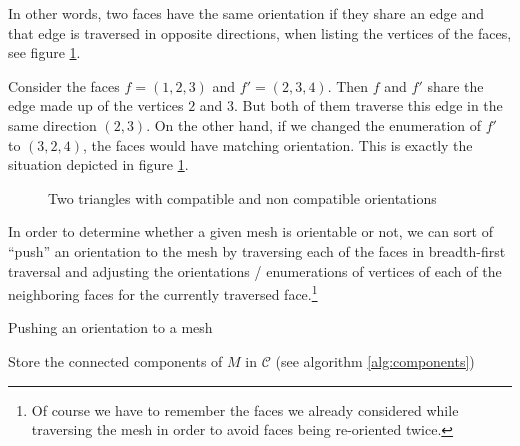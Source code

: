In other words, two faces have the same orientation if they share an edge and that edge is traversed in opposite directions, when listing the vertices of the faces, see figure \ref{fig:orientation}.
\begin{ex}
    Consider the faces $f = (1, 2, 3)$ and $f' = (2, 3, 4)$. Then $f$ and $f'$ share the edge made up of the vertices $2$ and $3$. But both of them traverse this edge in the same direction $(2,3)$. On the other hand, if we changed the enumeration of $f'$ to $(3, 2, 4)$, the faces would have matching orientation. This is exactly the situation depicted in figure \ref{fig:orientation}.
\end{ex}
\begin{figure}[ht]
    \centering
    \caption{Two triangles with compatible and non compatible orientations}
    \label{fig:orientation}
\end{figure}
In order to determine whether a given mesh is orientable or not, we can sort of ``push'' an orientation to the mesh by traversing each of the faces in breadth-first traversal and adjusting the orientations / enumerations of vertices of each of the neighboring faces for the currently traversed face.\footnote{Of course we have to remember the faces we already considered while traversing the mesh in order to avoid faces being re-oriented twice.}
\begin{algorithm}

    \caption{Pushing an orientation to a mesh}
    \label{alg:pushorientation}
    Store the connected components of $M$ in $\mathcal{C}$ (see algorithm \ref{alg:components})\;
\end{algorithm}

